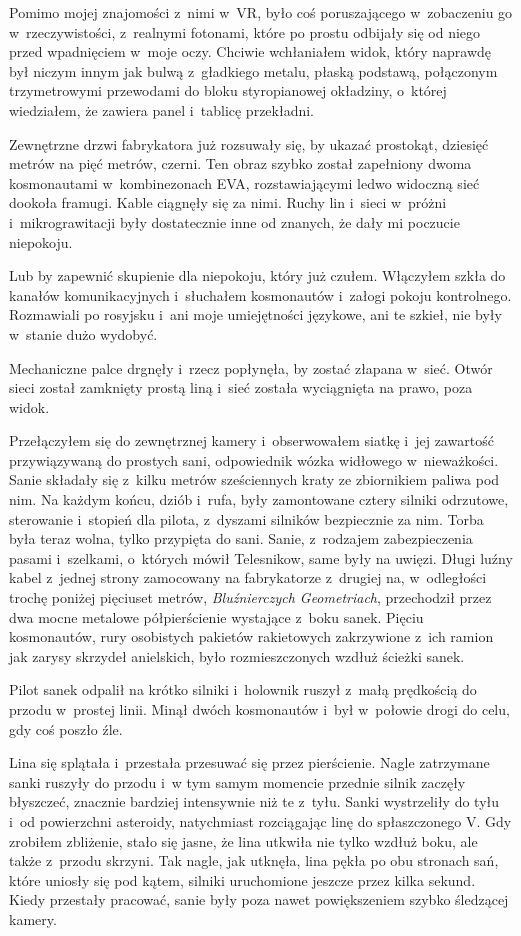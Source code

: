 \documentclass[oneside,polish,12pt,sfheadings]{mwbk}
\begin{document}
Pomimo mojej znajomości z~nimi w~VR, było coś poruszającego w~zobaczeniu
go w~rzeczywistości, z~realnymi fotonami, które po prostu odbijały się
od niego przed wpadnięciem w~moje oczy. Chciwie wchłaniałem widok, który
naprawdę był niczym innym jak bulwą z~gładkiego metalu, płaską podstawą,
połączonym trzymetrowymi przewodami do bloku styropianowej okładziny, o~której wiedziałem, że zawiera panel i~tablicę przekładni.

Zewnętrzne drzwi fabrykatora już rozsuwały się, by ukazać prostokąt,
dziesięć metrów na pięć metrów, czerni. Ten obraz szybko został
zapełniony dwoma kosmonautami w~kombinezonach EVA, rozstawiającymi ledwo
widoczną sieć dookoła framugi. Kable ciągnęły się za nimi. Ruchy lin i~sieci w~próżni i~mikrograwitacji były dostatecznie inne od znanych, że
dały mi poczucie niepokoju.

Lub by zapewnić skupienie dla niepokoju, który już czułem. Włączyłem
szkła do kanałów komunikacyjnych i~słuchałem kosmonautów i~załogi pokoju
kontrolnego. Rozmawiali po rosyjsku i~ani moje umiejętności językowe,
ani te szkieł, nie były w~stanie dużo wydobyć.

Mechaniczne palce drgnęły i~rzecz popłynęła, by zostać złapana w~sieć.
Otwór sieci został zamknięty prostą liną i~sieć została wyciągnięta na
prawo, poza widok.

Przełączyłem się do zewnętrznej kamery i~obserwowałem siatkę i~jej
zawartość przywiązywaną do prostych sani, odpowiednik wózka widłowego w~nieważkości. Sanie składały się z~kilku metrów sześciennych kraty ze
zbiornikiem paliwa pod nim. Na każdym końcu, dziób i~rufa, były
zamontowane cztery silniki odrzutowe, sterowanie i~stopień dla pilota, z~dyszami silników bezpiecznie za nim. Torba była teraz wolna, tylko
przypięta do sani. Sanie, z~rodzajem zabezpieczenia pasami i~szelkami, o~których mówił Telesnikow, same były na uwięzi. Długi luźny kabel z~jednej strony zamocowany na fabrykatorze z~drugiej na, w~odległości
trochę poniżej pięciuset metrów, \emph{Bluźnierczych Geometriach},
przechodził przez dwa mocne metalowe półpierścienie wystające z~boku
sanek. Pięciu kosmonautów, rury osobistych pakietów rakietowych
zakrzywione z~ich ramion jak zarysy skrzydeł anielskich, było
rozmieszczonych wzdłuż ścieżki sanek.

Pilot sanek odpalił na krótko silniki i~holownik ruszył z~małą
prędkością do przodu w~prostej linii. Minął dwóch kosmonautów i~był w~połowie drogi do celu, gdy coś poszło źle.

Lina się splątała i~przestała przesuwać się przez pierścienie. Nagle
zatrzymane sanki ruszyły do przodu i~w tym samym momencie przednie
silnik zaczęły błyszczeć, znacznie bardziej intensywnie niż te z~tyłu.
Sanki wystrzeliły do tyłu i~od powierzchni asteroidy, natychmiast
rozciągając linę do spłaszczonego V. Gdy zrobiłem zbliżenie, stało się
jasne, że lina utkwiła nie tylko wzdłuż boku, ale także z~przodu
skrzyni. Tak nagle, jak utknęła, lina pękła po obu stronach sań, które
uniosły się pod kątem, silniki uruchomione jeszcze przez kilka sekund.
Kiedy przestały pracować, sanie były poza nawet powiększeniem szybko
śledzącej kamery.
\end{document}
